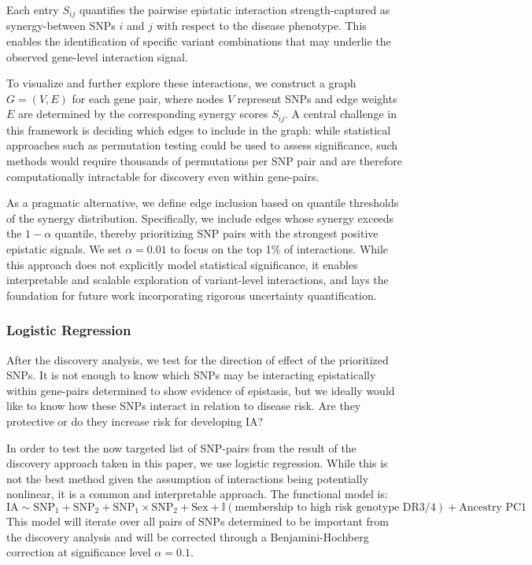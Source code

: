 \documentclass{article}\usepackage[]{graphicx}\usepackage[]{color}
\begin{document}
Each entry $S_{ij}$ quantifies the pairwise epistatic interaction strength-captured as synergy-between SNPs $i$ and $j$ with respect to the disease phenotype. This enables the identification of specific variant combinations that may underlie the observed gene-level interaction signal. 
\par
To visualize and further explore these interactions, we construct a graph $G = (V, E)$ for each gene pair, where nodes $V$ represent SNPs and edge weights $E$ are determined by the corresponding synergy scores $S_{ij}$. A central challenge in this framework is deciding which edges to include in the graph: while statistical approaches such as permutation testing could be used to assess significance, such methods would require thousands of permutations per SNP pair and are therefore computationally intractable for discovery even within gene-pairs.
\par
As a pragmatic alternative, we define edge inclusion based on quantile thresholds of the synergy distribution. Specifically, we include edges whose synergy exceeds the $1-\alpha$ quantile, thereby prioritizing SNP pairs with the strongest positive epistatic signals. We set $\alpha = 0.01$ to focus on the top 1\% of interactions. While this approach does not explicitly model statistical significance, it enables interpretable and scalable exploration of variant-level interactions, and lays the foundation for future work incorporating rigorous uncertainty quantification.

\subsubsection{Logistic Regression}
\label{sec:logreg}
After the discovery analysis, we test for the direction of effect of the prioritized SNPs. It is not enough to know which SNPs may be interacting epistatically within gene-pairs determined to show evidence of epistasis, but we ideally would like to know how these SNPs interact in relation to disease risk. Are they protective or do they increase risk for developing IA? 
\par
In order to test the now targeted list of SNP-pairs from the result of the discovery approach taken in this paper, we use logistic regression. While this is not the best method given the assumption of interactions being potentially nonlinear, it is a common and interpretable approach. The functional model is:
\begin{equation}
\text{IA} \sim \text{SNP}_1 + \text{SNP}_2 + \text{SNP}_1\times \text{SNP}_2 + \text{Sex} + \mathbb{I}(\text{membership to high risk genotype DR3/4}) + \text{Ancestry PC1}
\end{equation}
This model will iterate over all pairs of SNPs determined to be important from the discovery analysis and will be corrected through a Benjamini-Hochberg correction at significance level $\alpha = 0.1$.
\end{document}
